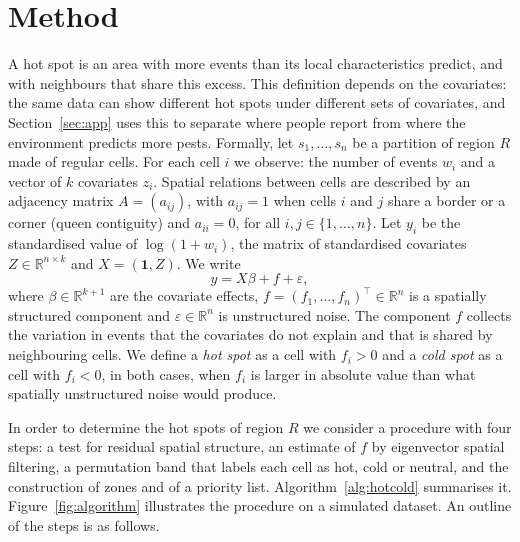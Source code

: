 \section{Method}\label{sec:met}

 A hot spot is an area with more events than its local characteristics predict, and with neighbours that share this excess. This definition depends on the covariates: the same data can show different hot spots under different sets of covariates, and Section~\ref{sec:app} uses this to separate where people report from where the environment predicts more pests. Formally, let
\label{sec:setting}%
 $s_1,\dots,s_n$ be a partition of region $R$ made of regular cells. For each cell $i$ we observe: the number of events $w_i$ and a vector of $k$ covariates $z_{i}$. Spatial relations between cells are described by an adjacency matrix $A=(a_{ij})$, with $a_{ij}=1$ when cells $i$ and $j$ share a border or a corner (queen contiguity) and $a_{ii}=0$, for all $i,j \in \{1, \ldots, n\}$.
Let $y_i$ be the standardised value of $\log(1+w_i)$,  the matrix of standardised covariates $Z \in \mathbb{R}^{n\times k}$ and $X=(\mathbf{1},Z)$. We write
\begin{equation}\label{eq:model}
  y = X\beta + f + \varepsilon ,
\end{equation}
where $\beta \in  \mathbb{R}^{k+1}$ are the covariate effects, $f=(f_1,\dots,f_n)^\top \in  \mathbb{R}^{n}$ is a spatially structured component and $\varepsilon \in  \mathbb{R}^{n}$ is unstructured noise. The component $f$ collects the variation in events that the covariates do not explain and that is shared by neighbouring cells. We define a \emph{hot spot} as a cell with $f_i>0$ and a \emph{cold spot} as a cell with $f_i<0$, in both cases, when $f_i$ is larger in absolute value than what spatially unstructured noise would produce.

In order to determine the hot spots of region $R$ we consider a procedure with four steps: a test for residual spatial structure, an estimate of $f$ by eigenvector spatial filtering, a permutation band that labels each cell as hot, cold or neutral, and the construction of zones and of a priority list. Algorithm~\ref{alg:hotcold} summarises it. Figure~\ref{fig:algorithm} illustrates the procedure on a simulated dataset. An outline of the steps is as follows.

